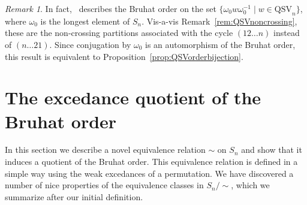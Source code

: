 \documentclass[submission]{FPSAC2024}
\theoremstyle{definition}
\theoremstyle{remark}
\newtheorem{rem}[equation]{Remark}
\numberwithin{equation}{section}
\newcommand{\QSV}{\mathrm{QSV}}
\begin{document}
\begin{rem}\label{rem:auto}
In fact,~\cite{GW16} describes the Bruhat order on the set $\{\omega_0w\omega_0^{-1}\; |\; w \in \QSV_{n}\}$, where $\omega_0$ is the longest element of $S_n$. 
Vis-a-vis Remark~\ref{rem:QSVnoncrossing}, these are the non-crossing partitions associated with the cycle $(12\ldots n)$ instead of $(n\ldots 21)$.
Since conjugation by $\omega_{0}$ is an automorphism of the Bruhat order, this result is equivalent to Proposition~\ref{prop:QSVorderbijection}.
%
%
\end{rem}

\section{The excedance quotient of the Bruhat order}
\label{sec:excedance}

In this section we describe a novel equivalence relation $\sim$ on $S_{n}$ and show that it induces a quotient of the Bruhat order.  
This equivalence relation is defined in a simple way using the weak excedances of a permutation.  
We have discovered a number of nice properties of the equivalence classes in $S_{n}\big/\!\!\sim$, which we summarize after our initial definition.
\end{document}
